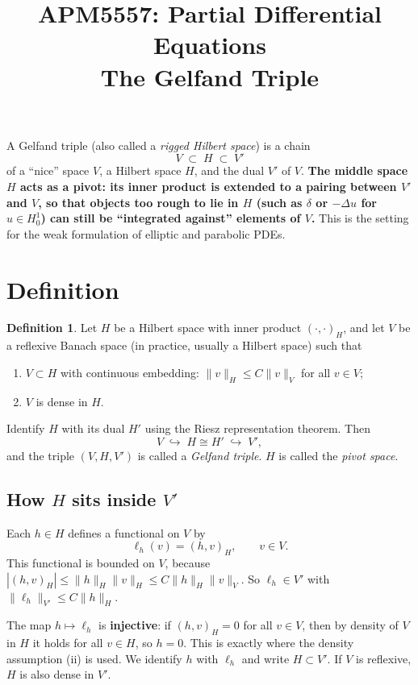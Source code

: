 \documentclass[11pt]{article}
\title{APM5557: Partial Differential Equations\\The Gelfand Triple}
\author{}
\date{}
\newcommand{\ip}[2]{( #1, #2 )}
\newcommand{\lap}{\Delta}
\theoremstyle{definition}
\newtheorem*{definition}{Definition}
\theoremstyle{plain}
\begin{document}
\maketitle

A Gelfand triple (also called a \emph{rigged Hilbert space}) is a chain
\[
  V \;\subset\; H \;\subset\; V'
\]
of a ``nice'' space $V$, a Hilbert space $H$, and the dual $V'$ of $V$.
\textbf{The middle space $H$ acts as a pivot: its inner product is extended to a
pairing between $V'$ and $V$, so that objects too rough to lie in $H$ (such as
$\delta$ or $-\lap u$ for $u\in H^1_0$) can still be ``integrated against''
elements of $V$.} This is the setting for the weak formulation of elliptic and
parabolic PDEs.

\section{Definition}

\begin{definition}
Let $H$ be a Hilbert space with inner product $\ip{\cdot}{\cdot}_H$, and let
$V$ be a reflexive Banach space (in practice, usually a Hilbert space) such that
\begin{enumerate}[label=(\roman*)]
  \item $V\subset H$ with continuous embedding: $\|v\|_H\le C\|v\|_V$ for all
    $v\in V$;
  \item $V$ is dense in $H$.
\end{enumerate}
Identify $H$ with its dual $H'$ using the Riesz representation theorem. Then
\[
  V \;\hookrightarrow\; H \cong H' \;\hookrightarrow\; V',
\]
and the triple $(V,H,V')$ is called a \emph{Gelfand triple}. $H$ is called the
\emph{pivot space}.
\end{definition}

\subsection*{How $H$ sits inside $V'$}

Each $h\in H$ defines a functional on $V$ by
\[
  \ell_h(v) = \ip{h}{v}_H, \qquad v\in V.
\]
This functional is bounded on $V$, because
$|\ip{h}{v}_H|\le\|h\|_H\|v\|_H\le C\|h\|_H\|v\|_V$. So $\ell_h\in V'$ with
$\|\ell_h\|_{V'}\le C\|h\|_H$.

The map $h\mapsto\ell_h$ is \textbf{injective}: if $\ip{h}{v}_H=0$ for all
$v\in V$, then by density of $V$ in $H$ it holds for all $v\in H$, so $h=0$.
This is exactly where the density assumption (ii) is used. We identify $h$ with
$\ell_h$ and write $H\subset V'$. If $V$ is reflexive, $H$ is also dense in
$V'$.
\end{document}
